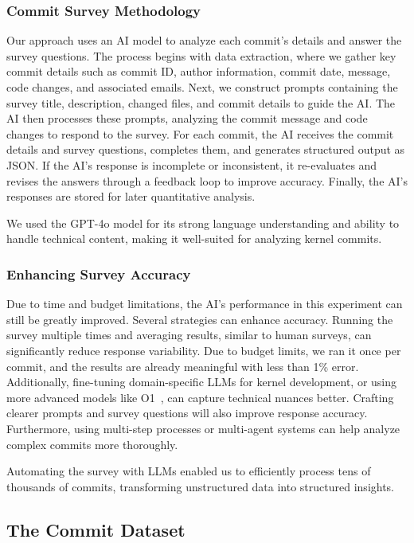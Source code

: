 \subsubsection{Commit Survey Methodology}

Our approach uses an AI model to analyze each commit's details and answer the survey questions. The process begins with data extraction, where we gather key commit details such as commit ID, author information, commit date, message, code changes, and associated emails. Next, we construct prompts containing the survey title, description, changed files, and commit details to guide the AI. The AI then processes these prompts, analyzing the commit message and code changes to respond to the survey. For each commit, the AI receives the commit details and survey questions, completes them, and generates structured output as JSON. If the AI's response is incomplete or inconsistent, it re-evaluates and revises the answers through a feedback loop to improve accuracy. Finally, the AI's responses are stored for later quantitative analysis.

We used the GPT-4o model for its strong language understanding and ability to handle technical content, making it well-suited for analyzing kernel commits.

\subsubsection{Enhancing Survey Accuracy}

Due to time and budget limitations, the AI's performance in this experiment can still be greatly improved. Several strategies can enhance accuracy. Running the survey multiple times and averaging results, similar to human surveys, can significantly reduce response variability. Due to budget limits, we ran it once per commit, and the results are already meaningful with less than 1\% error. Additionally, fine-tuning domain-specific LLMs for kernel development, or using more advanced models like O1~\cite{o1}, can capture technical nuances better. Crafting clearer prompts and survey questions will also improve response accuracy. Furthermore, using multi-step processes or multi-agent systems can help analyze complex commits more thoroughly.

Automating the survey with LLMs enabled us to efficiently process tens of thousands of commits, transforming unstructured data into structured insights.

\subsection{The Commit Dataset}

